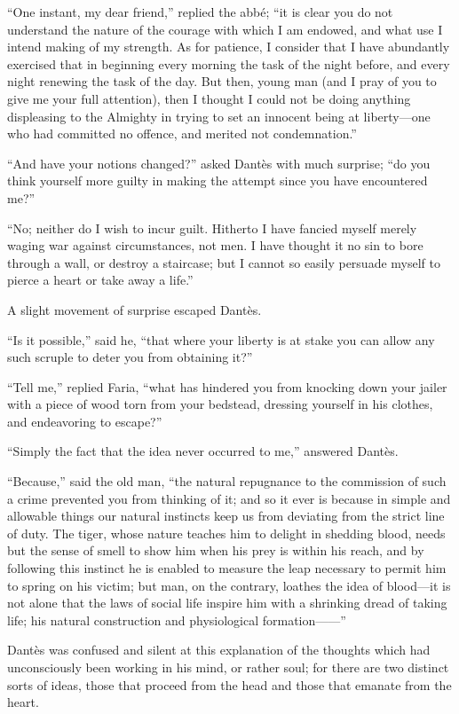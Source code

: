“One instant, my dear friend,” replied the abbé; “it is clear you do
not understand the nature of the courage with which I am endowed, and
what use I intend making of my strength. As for patience, I consider
that I have abundantly exercised that in beginning every morning the
task of the night before, and every night renewing the task of the day.
But then, young man (and I pray of you to give me your full attention),
then I thought I could not be doing anything displeasing to the
Almighty in trying to set an innocent being at liberty—one who had
committed no offence, and merited not condemnation.”

“And have your notions changed?” asked Dantès with much surprise; “do
you think yourself more guilty in making the attempt since you have
encountered me?”

“No; neither do I wish to incur guilt. Hitherto I have fancied myself
merely waging war against circumstances, not men. I have thought it no
sin to bore through a wall, or destroy a staircase; but I cannot so
easily persuade myself to pierce a heart or take away a life.”

A slight movement of surprise escaped Dantès.

“Is it possible,” said he, “that where your liberty is at stake you can
allow any such scruple to deter you from obtaining it?”

“Tell me,” replied Faria, “what has hindered you from knocking down
your jailer with a piece of wood torn from your bedstead, dressing
yourself in his clothes, and endeavoring to escape?”

“Simply the fact that the idea never occurred to me,” answered Dantès.

“Because,” said the old man, “the natural repugnance to the commission
of such a crime prevented you from thinking of it; and so it ever is
because in simple and allowable things our natural instincts keep us
from deviating from the strict line of duty. The tiger, whose nature
teaches him to delight in shedding blood, needs but the sense of smell
to show him when his prey is within his reach, and by following this
instinct he is enabled to measure the leap necessary to permit him to
spring on his victim; but man, on the contrary, loathes the idea of
blood—it is not alone that the laws of social life inspire him with a
shrinking dread of taking life; his natural construction and
physiological formation——”

Dantès was confused and silent at this explanation of the thoughts
which had unconsciously been working in his mind, or rather soul; for
there are two distinct sorts of ideas, those that proceed from the head
and those that emanate from the heart.

